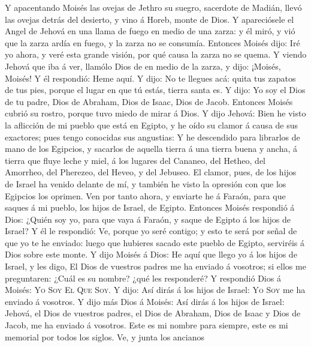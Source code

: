  Y apacentando Moisés las ovejas de Jethro su suegro,
sacerdote de Madián, llevó las ovejas detrás del desierto, y vino á
Horeb, monte de Dios.  Y apareciósele el Angel de Jehová
en una llama de fuego en medio de una zarza: y él miró, y vió que la
zarza ardía en fuego, y la zarza no se consumía.  Entonces
Moisés dijo: Iré yo ahora, y veré esta grande visión, por qué causa la
zarza no se quema.  Y viendo Jehová que iba á ver, llamólo
Dios de en medio de la zarza, y dijo: ¡Moisés, Moisés! Y él respondió:
Heme aquí.  Y dijo: No te llegues acá: quita tus zapatos
de tus pies, porque el lugar en que tú estás, tierra santa es.
 Y dijo: Yo soy el Dios de tu padre, Dios de Abraham, Dios
de Isaac, Dios de Jacob. Entonces Moisés cubrió su rostro, porque tuvo
miedo de mirar á Dios.  Y dijo Jehová: Bien he visto la
aflicción de mi pueblo que está en Egipto, y he oído su clamor á causa
de sus exactores; pues tengo conocidas sus angustias:  Y
he descendido para librarlos de mano de los Egipcios, y sacarlos de
aquella tierra á una tierra buena y ancha, á tierra que fluye leche y
miel, á los lugares del Cananeo, del Hetheo, del Amorrheo, del Pherezeo,
del Heveo, y del Jebuseo.  El clamor, pues, de los hijos
de Israel ha venido delante de mí, y también he visto la opresión con
que los Egipcios los oprimen.  Ven por tanto ahora, y
enviarte he á Faraón, para que saques á mi pueblo, los hijos de Israel,
de Egipto.  Entonces Moisés respondió á Dios: ¿Quién soy
yo, para que vaya á Faraón, y saque de Egipto á los hijos de Israel?
 Y él le respondió: Ve, porque yo seré contigo; y esto te
será por señal de que yo te he enviado: luego que hubieres sacado este
pueblo de Egipto, serviréis á Dios sobre este monte.  Y
dijo Moisés á Dios: He aquí que llego yo á los hijos de Israel, y les
digo, El Dios de vuestros padres me ha enviado á vosotros; si ellos me
preguntaren: ¿Cuál es su nombre? ¿qué les responderé?  Y
respondió Dios á Moisés: \textsc{Yo} \textsc{Soy} \textsc{El}
\textsc{Que} \textsc{Soy}. Y dijo: Así dirás á los hijos de Israel:
\textsc{Yo} \textsc{Soy} me ha enviado á vosotros.  Y
dijo más Dios á Moisés: Así dirás á los hijos de Israel: Jehová, el Dios
de vuestros padres, el Dios de Abraham, Dios de Isaac y Dios de Jacob,
me ha enviado á vosotros. Este es mi nombre para siempre, este es mi
memorial por todos los siglos.  Ve, y junta los ancianos
